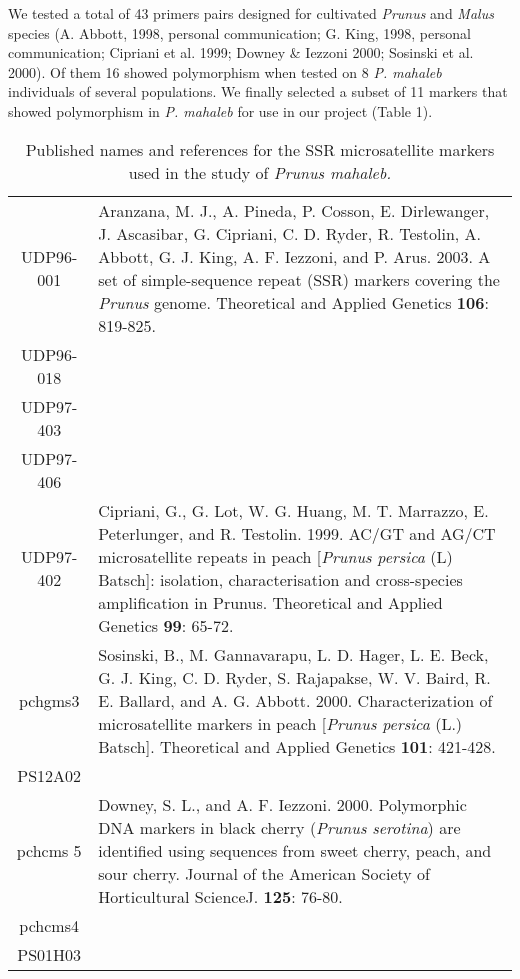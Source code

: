 \documentclass[a4paper,12pt]{article}
\newcommand{\tab}{\hspace{5mm}}
\begin{document}
\tab We tested a total of 43 primers pairs designed for cultivated \textit{Prunus} and \textit{Malus} species (A. Abbott, 1998, personal communication; G. King, 1998, personal communication; Cipriani et al. 1999; Downey \& Iezzoni 2000; Sosinski et al. 2000). Of them 16 showed polymorphism when tested on 8 \textit{P. mahaleb} individuals of several populations. We finally selected a subset of 11 markers that showed polymorphism in \textit{P. mahaleb} for use in our project (Table 1).


\begin{table}
\captionsetup{width=14cm}
\caption{Published names and references for the SSR microsatellite markers used in the study of \textit{Prunus mahaleb.}}

\vspace{0.5cm}
\begin{tabular}{cl}
\hline 
UDP96-001 & Aranzana, M. J., A. Pineda, P. Cosson, E. Dirlewanger, J. Ascasibar, G. Cipriani, C. D. Ryder, R. Testolin, A. Abbott, G. J. King, A. F. Iezzoni, and P. Arus. 2003. A set of simple-sequence repeat (SSR) markers covering the \textit{Prunus} genome. Theoretical and Applied Genetics \textbf{106}: 819-825. \\UDP96-018 &  \\UDP97-403 &  \\UDP97-406 &  \\UDP97-402 & Cipriani, G., G. Lot, W. G. Huang, M. T. Marrazzo, E. Peterlunger, and R. Testolin. 1999. AC/GT and AG/CT microsatellite repeats in peach [\textit{Prunus persica} (L) Batsch]: isolation, characterisation and cross-species amplification in Prunus. Theoretical and Applied Genetics \textbf{99}: 65-72. \\pchgms3 & Sosinski, B., M. Gannavarapu, L. D. Hager, L. E. Beck, G. J. King, C. D. Ryder, S. Rajapakse, W. V. Baird, R. E. Ballard, and A. G. Abbott. 2000. Characterization of microsatellite markers in peach [\textit{Prunus persica} (L.) Batsch]. Theoretical and Applied Genetics \textbf{101}: 421-428. \\PS12A02 &  \\pchcms 5 & Downey, S. L., and A. F. Iezzoni. 2000. Polymorphic DNA markers in black cherry (\textit{Prunus serotina}) are identified using sequences from sweet cherry, peach, and sour cherry. Journal of the American Society of Horticultural ScienceJ. \textbf{125}: 76-80. \\pchcms4 &  \\PS01H03 &  \\
\hline
\end{tabular}
\end{table}
\end{document}
